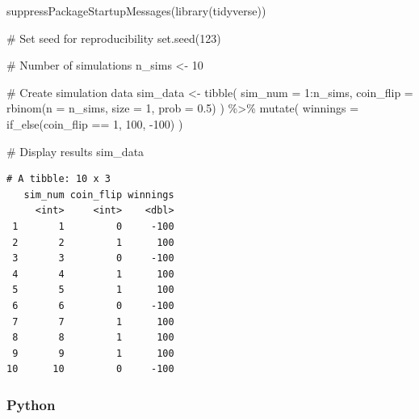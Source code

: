 \documentclass[
  letterpaper,
  DIV=11,
  numbers=noendperiod]{scrartcl}
\newenvironment{Shaded}{\begin{snugshade}}{\end{snugshade}}
\newcommand{\AttributeTok}[1]{\textcolor[rgb]{0.40,0.45,0.13}{#1}}
\newcommand{\CommentTok}[1]{\textcolor[rgb]{0.37,0.37,0.37}{#1}}
\newcommand{\DecValTok}[1]{\textcolor[rgb]{0.68,0.00,0.00}{#1}}
\newcommand{\FloatTok}[1]{\textcolor[rgb]{0.68,0.00,0.00}{#1}}
\newcommand{\FunctionTok}[1]{\textcolor[rgb]{0.28,0.35,0.67}{#1}}
\newcommand{\NormalTok}[1]{\textcolor[rgb]{0.00,0.23,0.31}{#1}}
\newcommand{\OtherTok}[1]{\textcolor[rgb]{0.00,0.23,0.31}{#1}}
\newcommand{\SpecialCharTok}[1]{\textcolor[rgb]{0.37,0.37,0.37}{#1}}
\theoremstyle{definition}
\theoremstyle{remark}
\begin{document}
\begin{Shaded}
\begin{Highlighting}[]
\FunctionTok{suppressPackageStartupMessages}\NormalTok{(}\FunctionTok{library}\NormalTok{(tidyverse))}

\CommentTok{\# Set seed for reproducibility}
\FunctionTok{set.seed}\NormalTok{(}\DecValTok{123}\NormalTok{)}

\CommentTok{\# Number of simulations}
\NormalTok{n\_sims }\OtherTok{\textless{}{-}} \DecValTok{10}

\CommentTok{\# Create simulation data}
\NormalTok{sim\_data }\OtherTok{\textless{}{-}} \FunctionTok{tibble}\NormalTok{(}
  \AttributeTok{sim\_num =} \DecValTok{1}\SpecialCharTok{:}\NormalTok{n\_sims,}
  \AttributeTok{coin\_flip =} \FunctionTok{rbinom}\NormalTok{(}\AttributeTok{n =}\NormalTok{ n\_sims, }\AttributeTok{size =} \DecValTok{1}\NormalTok{, }\AttributeTok{prob =} \FloatTok{0.5}\NormalTok{)}
\NormalTok{) }\SpecialCharTok{\%\textgreater{}\%}
  \FunctionTok{mutate}\NormalTok{(}
    \AttributeTok{winnings =} \FunctionTok{if\_else}\NormalTok{(coin\_flip }\SpecialCharTok{==} \DecValTok{1}\NormalTok{, }\DecValTok{100}\NormalTok{, }\SpecialCharTok{{-}}\DecValTok{100}\NormalTok{)}
\NormalTok{  )}

\CommentTok{\# Display results}
\NormalTok{sim\_data}
\end{Highlighting}
\end{Shaded}

\begin{verbatim}
# A tibble: 10 x 3
   sim_num coin_flip winnings
     <int>     <int>    <dbl>
 1       1         0     -100
 2       2         1      100
 3       3         0     -100
 4       4         1      100
 5       5         1      100
 6       6         0     -100
 7       7         1      100
 8       8         1      100
 9       9         1      100
10      10         0     -100
\end{verbatim}

\subsubsection{Python}
\end{document}
